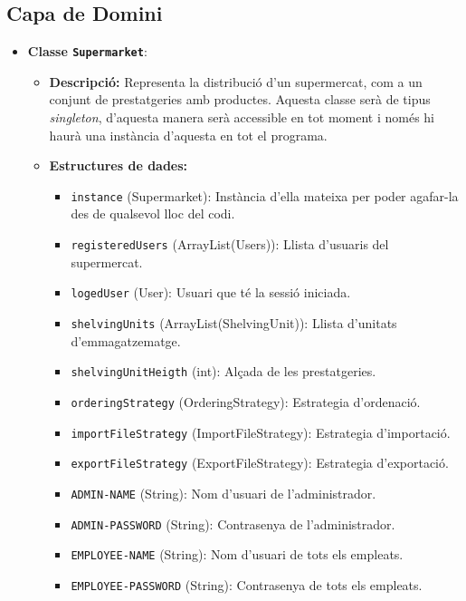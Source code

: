 \documentclass[a4paper,12pt]{report}
\begin{document}
\subsection{Capa de Domini}
\begin{itemize}
	\item \textbf{Classe \texttt{Supermarket}}:
	      \begin{itemize}
		      \item \textbf{Descripció:} Representa la distribució d'un supermercat, com a un conjunt de prestatgeries amb productes. Aquesta classe serà de tipus \textit{singleton}, d'aquesta manera serà accessible en tot moment i només hi haurà una instància d'aquesta en tot el programa.
		      \item \textbf{Estructures de dades:}
		            \begin{itemize}
			            \item \texttt{instance} (Supermarket): Instància d'ella mateixa per poder agafar-la des de qualsevol lloc del codi.
			            \item \texttt{registeredUsers} (ArrayList(Users)): Llista d'usuaris del supermercat.
			            \item \texttt{logedUser} (User): Usuari que té la sessió iniciada.
			            \item \texttt{shelvingUnits} (ArrayList(ShelvingUnit)): Llista d'unitats d'emmagatzematge.
			            \item \texttt{shelvingUnitHeigth} (int): Alçada de les prestatgeries.
			            \item \texttt{orderingStrategy} (OrderingStrategy): Estrategia d'ordenació.
			            \item \texttt{importFileStrategy} (ImportFileStrategy): Estrategia d'importació.
			            \item \texttt{exportFileStrategy} (ExportFileStrategy): Estrategia d'exportació.
			            \item \texttt{ADMIN-NAME} (String): Nom d'usuari de l'administrador.
			            \item \texttt{ADMIN-PASSWORD} (String): Contrasenya de l'administrador.
			            \item \texttt{EMPLOYEE-NAME} (String): Nom d'usuari de tots els empleats.
			            \item \texttt{EMPLOYEE-PASSWORD} (String): Contrasenya de tots els empleats.
		            \end{itemize}
	      \end{itemize}

\end{itemize}
\end{document}
